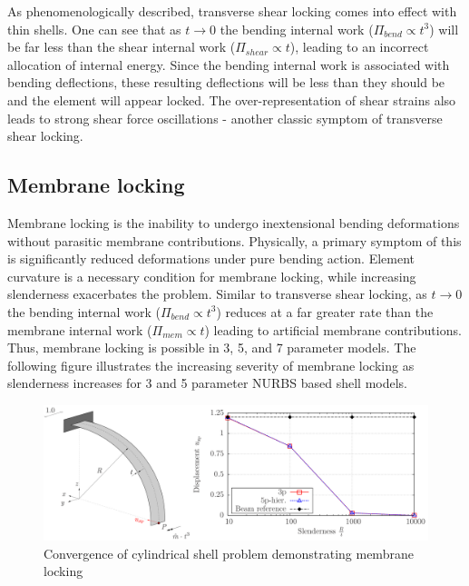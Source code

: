 As phenomenologically described, transverse shear locking comes into effect with thin shells. One can see that as $t \rightarrow 0$ the bending internal work ($\Pi_{bend} \propto t^3$) will be far less than the shear internal work ($\Pi_{shear} \propto t$), leading to an incorrect allocation of internal energy. Since the bending internal work is associated with bending deflections, these resulting deflections will be less than they should be and the element will appear locked. The over-representation of shear strains also leads to strong shear force oscillations - another classic symptom of transverse shear locking.

\subsection{Membrane locking}
\label{membrane_locking_theory}

Membrane locking is the inability to undergo inextensional bending deformations without parasitic membrane contributions. Physically, a primary symptom of this is significantly reduced deformations under pure bending action. Element curvature is a necessary condition for membrane locking, while increasing slenderness exacerbates the problem. Similar to transverse shear locking, as $t \rightarrow 0$ the bending internal work ($\Pi_{bend} \propto t^3$) reduces at a far greater rate than the membrane internal work ($\Pi_{mem} \propto t$) leading to artificial membrane contributions. Thus, membrane locking is possible in 3, 5, and 7 parameter models. The following figure illustrates the increasing severity of membrane locking as slenderness increases for 3 and 5 parameter NURBS based shell models.

\begin{figure}[H]
	\centering
	\def\svgwidth{\columnwidth}
	\includegraphics[width=14cm]{images/membranelocking.png}
	\caption{Convergence of cylindrical shell problem demonstrating membrane locking \cite{Echter13}}
	\label{ansexample}
\end{figure}

